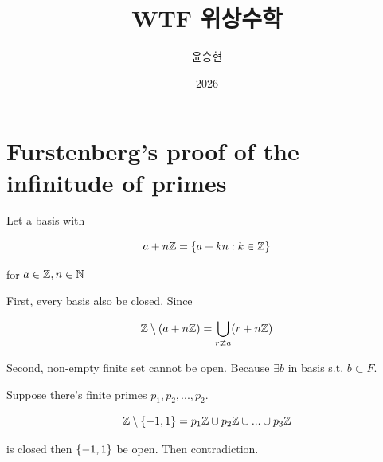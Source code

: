 \documentclass{article}
\title{WTF 위상수학}
\author{윤승현}
\date{2026}
\begin{document}
\maketitle

\section{Furstenberg's proof of the infinitude of primes}

Let a basis with 

\[
    a+n\mathbb{Z} = \left\{ a+kn: k\in \mathbb{Z} \right\}
\]

for $a \in \mathbb{Z}, n \in \mathbb{N}$

First, every basis also be closed. Since

\[
    \mathbb{Z} \setminus (a+n\mathbb{Z}) = \bigcup_{r \not\equiv a} (r+n\mathbb{Z})
\]

Second, non-empty finite set cannot be open. Because $\exists b$ in basis s.t. $b \subset F$.

Suppose there's finite primes $p_1, p_2, ..., p_2$.

\[
    \mathbb{Z} \setminus \left\{ -1, 1 \right\} = p_1\mathbb{Z} \cup p_2\mathbb{Z} \cup ... \cup p_3\mathbb{Z}
\]

is closed then $\left\{ -1, 1 \right\}$ be open. Then contradiction.
\end{document}
